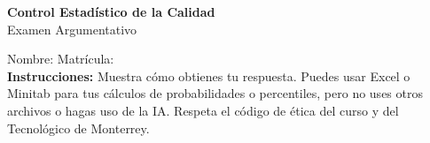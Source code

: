 \documentclass[11pt]{article}
\begin{document}
\begin{center}
\large \textbf{Control Estad\'istico de la Calidad} \\
\large Examen Argumentativo
\end{center}

Nombre: \underline{\hspace*{3in}} \quad Matr\'icula:\underline{\hspace*{2in}} \\

\noindent \textbf{Instrucciones:} Muestra c\'omo obtienes tu respuesta. Puedes usar Excel 
o Minitab para tus cálculos de probabilidades o 
percentiles, pero no uses otros archivos o hagas uso de la IA. Respeta el 
c\'odigo de \'etica del curso y del Tecnol\'ogico 
de Monterrey.

\begin{enumerate}





\end{enumerate}
\end{document}
